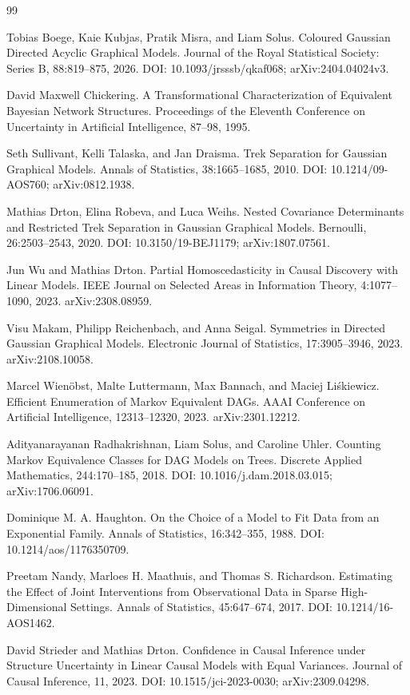\documentclass{article}
\begin{document}
\begin{thebibliography}{99}

   Tobias Boege, Kaie Kubjas, Pratik Misra, and Liam Solus. Coloured Gaussian Directed Acyclic Graphical Models. Journal of the Royal Statistical Society: Series B, 88:819--875, 2026. DOI: 10.1093/jrsssb/qkaf068; arXiv:2404.04024v3.

   David Maxwell Chickering. A Transformational Characterization of Equivalent Bayesian Network Structures. Proceedings of the Eleventh Conference on Uncertainty in Artificial Intelligence, 87--98, 1995.

   Seth Sullivant, Kelli Talaska, and Jan Draisma. Trek Separation for Gaussian Graphical Models. Annals of Statistics, 38:1665--1685, 2010. DOI: 10.1214/09-AOS760; arXiv:0812.1938.

   Mathias Drton, Elina Robeva, and Luca Weihs. Nested Covariance Determinants and Restricted Trek Separation in Gaussian Graphical Models. Bernoulli, 26:2503--2543, 2020. DOI: 10.3150/19-BEJ1179; arXiv:1807.07561.

   Jun Wu and Mathias Drton. Partial Homoscedasticity in Causal Discovery with Linear Models. IEEE Journal on Selected Areas in Information Theory, 4:1077--1090, 2023. arXiv:2308.08959.

   Visu Makam, Philipp Reichenbach, and Anna Seigal. Symmetries in Directed Gaussian Graphical Models. Electronic Journal of Statistics, 17:3905--3946, 2023. arXiv:2108.10058.

   Marcel Wienöbst, Malte Luttermann, Max Bannach, and Maciej Liśkiewicz. Efficient Enumeration of Markov Equivalent DAGs. AAAI Conference on Artificial Intelligence, 12313--12320, 2023. arXiv:2301.12212.

   Adityanarayanan Radhakrishnan, Liam Solus, and Caroline Uhler. Counting Markov Equivalence Classes for DAG Models on Trees. Discrete Applied Mathematics, 244:170--185, 2018. DOI: 10.1016/j.dam.2018.03.015; arXiv:1706.06091.

   Dominique M. A. Haughton. On the Choice of a Model to Fit Data from an Exponential Family. Annals of Statistics, 16:342--355, 1988. DOI: 10.1214/aos/1176350709.

   Preetam Nandy, Marloes H. Maathuis, and Thomas S. Richardson. Estimating the Effect of Joint Interventions from Observational Data in Sparse High-Dimensional Settings. Annals of Statistics, 45:647--674, 2017. DOI: 10.1214/16-AOS1462.

   David Strieder and Mathias Drton. Confidence in Causal Inference under Structure Uncertainty in Linear Causal Models with Equal Variances. Journal of Causal Inference, 11, 2023. DOI: 10.1515/jci-2023-0030; arXiv:2309.04298.

\end{thebibliography}
\end{document}
